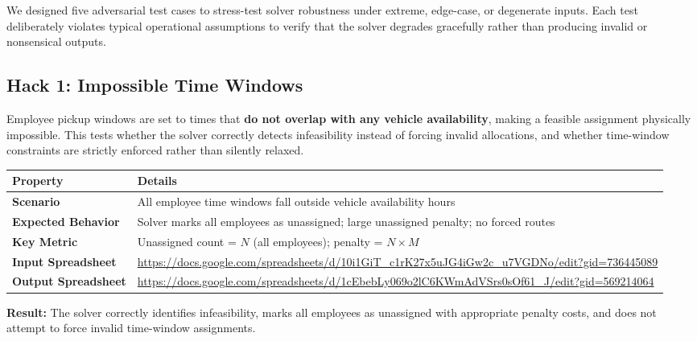 \documentclass[11pt,a4paper]{article}
\begin{document}
We designed five adversarial test cases to stress-test solver robustness under extreme, edge-case, or degenerate inputs. Each test deliberately violates typical operational assumptions to verify that the solver degrades gracefully rather than producing invalid or nonsensical outputs.

\subsection{Hack 1: Impossible Time Windows}

\begin{hackbox}
Employee pickup windows are set to times that \textbf{do not overlap with any vehicle availability}, making a feasible assignment physically impossible. This tests whether the solver correctly detects infeasibility instead of forcing invalid allocations, and whether time-window constraints are strictly enforced rather than silently relaxed.
\end{hackbox}

\begin{table}[H]
\centering
\begin{tabular}{p{3.5cm}p{10cm}}
\toprule
\textbf{Property} & \textbf{Details} \\
\midrule
\rowcolor{rowalt}
\textbf{Scenario} & All employee time windows fall outside vehicle availability hours \\
\textbf{Expected Behavior} & Solver marks all employees as unassigned; large unassigned penalty; no forced routes \\
\rowcolor{rowalt}
\textbf{Key Metric} & Unassigned count = $N$ (all employees); penalty = $N \times M$ \\
\textbf{Input Spreadsheet} & \scriptsize\url{https://docs.google.com/spreadsheets/d/10i1GiT_c1rK27x5uJG4iGw2c_u7VGDNo/edit?gid=736445089} \\
\rowcolor{rowalt}
\textbf{Output Spreadsheet} & \scriptsize\url{https://docs.google.com/spreadsheets/d/1cEbebLy069o2lC6KWmAdVSrs0sOf61_J/edit?gid=569214064} \\
\bottomrule
\end{tabular}
\end{table}

\begin{resultbox}
\textbf{Result:} The solver correctly identifies infeasibility, marks all employees as unassigned with appropriate penalty costs, and does not attempt to force invalid time-window assignments.
\end{resultbox}
\end{document}
